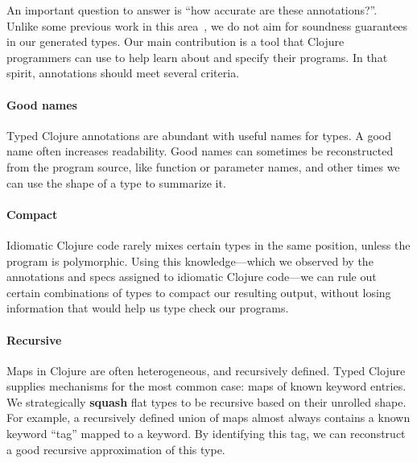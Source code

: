 \documentclass[9pt]{extarticle}
\begin{document}
%
%
%

An important question to answer is ``how accurate are these annotations?''.
Unlike some previous work in this area~\cite{An10dynamicinference}, we do not aim for soundness guarantees
in our generated types.
Our main contribution is a tool that Clojure programmers
can use to help learn about and specify their programs.
In that spirit, annotations should meet several criteria.

\paragraph{Good names}
Typed Clojure %
annotations are abundant
with useful names for types. A good name often increases
readability.
Good names can sometimes be reconstructed from the program source,
like function or parameter names, and other times 
we can use the shape of a type to summarize it.

\paragraph{Compact}
Idiomatic Clojure code rarely mixes certain types in the same position,
unless the program is polymorphic. Using this knowledge---which we observed
by the annotations and specs assigned to idiomatic Clojure 
code---we can rule out certain combinations of types to compact our
resulting output, without losing information that would help us
type check our programs.

\paragraph{Recursive}
Maps in Clojure are often heterogeneous, and recursively defined.
Typed Clojure %
supplies mechanisms for the most
common case: maps of known keyword entries.
We strategically \textbf{squash} flat types to be recursive
based on their unrolled shape.
For example, a recursively defined union of maps almost always
contains a known keyword ``tag'' mapped to a keyword.
By identifying this tag, we can reconstruct a good recursive
approximation of this type.
\end{document}
